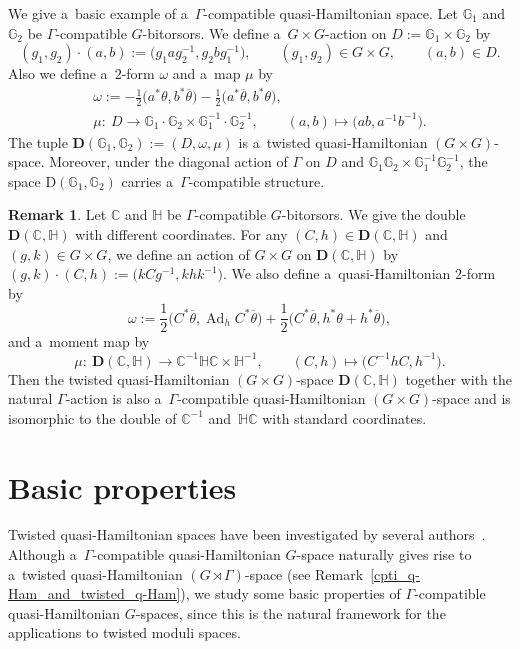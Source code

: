 \documentclass[pdftex]{sigma}
\numberwithin{equation}{section}
\theoremstyle{definition}
\newtheorem{Remark}[Theorem]{Remark}
\newcommand{\Ad}{\operatorname{Ad}}
\newcommand{\bG}{\mathbb{G}}
\newcommand{\bH}{\mathbb{H}}
\newcommand{\bC}{\mathbb{C}}
\begin{document}
We give a~basic example of a~$\Gamma$-compatible quasi-Hamiltonian space.
Let $\bG_1$ and $\bG_2$ be $\Gamma$-compatible $G$-bitorsors.
We define a~$G \times G$-action on $D := \bG_1 \times \bG_2$ by
\[ (g_1, g_2) \cdot (a,b) := \bigl(g_1 a g_2^{-1}, g_2 b g_1^{-1}\bigr), \qquad (g_1,g_2) \in G \times G,\qquad (a,b) \in D.\]
Also we define a~$2$-form $\omega$ and a~map $\mu$ by
\begin{gather*}
 \omega := -\frac{1}{2}\bigl(a^* \theta, b^* \overline{\theta}\bigr)-\frac{1}{2}\bigl(a^*\overline{\theta},b^*\theta\bigr),\\
 \mu \colon \ D \to \bG_1\cdot \bG_2 \times \bG_1^{-1} \cdot \bG_2^{-1},\qquad
(a,b) \mapsto \bigl(ab, a^{-1}b^{-1}\bigr).
\end{gather*}
The tuple $\textbf{D}(\bG_1,\bG_2) := (D,\omega, \mu)$ is a~twisted quasi-Hamiltonian $(G\times G)$-space.
Moreover, under the diagonal action of $\Gamma$ on $D$ and $\bG_1\bG_2 \times \bG_1^{-1}\bG_2^{-1}$, the space $\text{D}(\bG_1,\bG_2)$ carries a~$\Gamma$-compatible structure.

\begin{Remark}\label{the double with different coordinates}
 Let $\bC$ and $\bH$ be $\Gamma$-compatible $G$-bitorsors. We give the double $\textbf{D}(\bC,\bH)$ with different coordinates.
 For any $(C,h) \in \textbf{D}(\bC,\bH)$ and $(g,k) \in G \times G$, we define an action of $G \times G$ on $\textbf{D}(\bC,\bH)$ by $(g,k) \cdot (C,h) := \bigl(kCg^{-1},khk^{-1}\bigr)$.
 We also define a~quasi-Hamiltonian $2$-form by
 \[\omega := \frac{1}{2}\bigl(C^*\overline{\theta},\Ad_{h}C^*\overline{\theta}\bigr)+\frac{1}{2}\bigl(C^*\overline{\theta},h^*\theta+h^*\overline{\theta}\bigr),\]
 and a~moment map by
 \[
 \mu \colon\ \textbf{D}(\bC,\bH) \to \bC^{-1} \bH \bC \times \bH^{-1},\qquad (C,h) \mapsto \bigl(C^{-1}hC, h^{-1}\bigr).
 \]
 Then the twisted quasi-Hamiltonian $(G \times G)$-space $\textbf{D}(\bC,\bH)$ together with the natural $\Gamma$-action is also a~$\Gamma$-compatible quasi-Hamiltonian $(G \times G)$-space and is isomorphic to the double of $\bC^{-1}$ and~$\bH \bC$ with standard coordinates.
\end{Remark}

\section{Basic properties}\label{3Basic_properties}

Twisted quasi-Hamiltonian spaces have been investigated by several authors~\cite{B-Y2015,Knop,Meinrenken2017}.
Although a~$\Gamma$-compatible quasi-Hamiltonian $G$-space naturally gives rise to a~twisted quasi-Hamil\-tonian $(G \rtimes \Gamma)$-space (see Remark~\ref{cpti_q-Ham_and_twisted_q-Ham}), we study some basic properties of $\Gamma$-compatible quasi-Hamiltonian $G$-spaces, since this is the natural framework for the applications to twisted moduli spaces.
\end{document}
